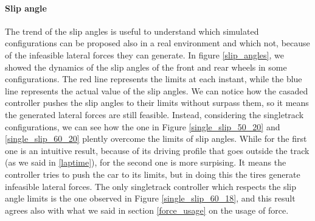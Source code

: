 \documentclass[a4paper, onecolumn, 12pt]{article}
\begin{document}
\paragraph{Slip angle}
The trend of the slip angles is useful to understand which simulated configurations can be
proposed also in a real environment and which not, because of the infeasible lateral forces
they can generate. In figure \ref{slip_angles}, we showed the dynamics of the slip angles of 
the front and rear wheels in some configurations. The red line represents the limits at
each instant, while the blue line represents the actual value of the slip angles. 
We can notice how the casaded controller pushes the slip angles to their limits
without surpass them, so it means the generated lateral forces are still feasible.
Instead, considering the singletrack configurations, we can see how the one in Figure
\ref{single_slip_50_20} and \ref{single_slip_60_20} plently overcome the limits of slip angles.
While for the first one is an intuitive result, because of its driving profile that goes outside
the track (as we said in \ref{laptime}), for the second one is more surpising. It means the 
controller tries to push the car to its limits, but in doing this the tires generate infeasible
lateral forces. The only singletrack controller which respects the slip angle limits is the
one observed in Figure \ref{single_slip_60_18}, and this result agrees also with what we said 
in section \ref{force_usage} on the usage of force.
\end{document}
